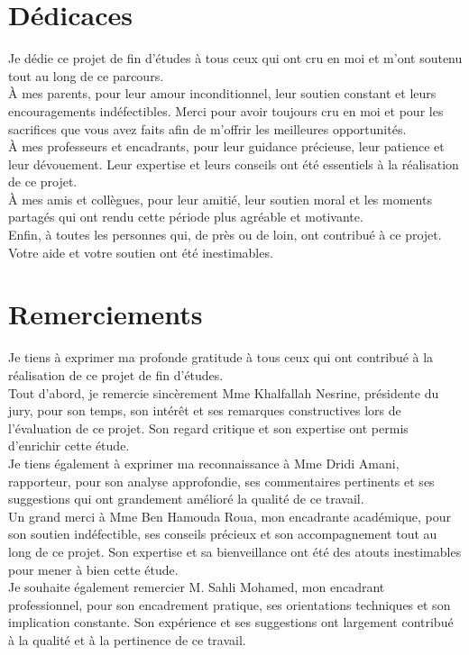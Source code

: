 \documentclass[12pt,a4paper]{report}
\begin{document}
\cleardoublepage
\thispagestyle{empty}
\chapter*{Dédicaces}
{}
Je dédie ce projet de fin d’études à tous ceux qui ont cru en moi et m’ont soutenu tout au long de ce parcours.\\
À mes parents, pour leur amour inconditionnel, leur soutien constant et leurs encouragements indéfectibles. Merci pour avoir toujours cru en moi et pour les sacrifices que vous avez faits afin de m’offrir les meilleures opportunités.\\
À mes professeurs et encadrants, pour leur guidance précieuse, leur patience et leur dévouement. Leur expertise et leurs conseils ont été essentiels à la réalisation de ce projet.\\
À mes amis et collègues, pour leur amitié, leur soutien moral et les moments partagés qui ont rendu cette période plus agréable et motivante.\\
Enfin, à toutes les personnes qui, de près ou de loin, ont contribué à ce projet. Votre aide et votre soutien ont été inestimables.

\cleardoublepage
{}
\chapter*{Remerciements}
Je tiens à exprimer ma profonde gratitude à tous ceux qui ont contribué à la réalisation de ce projet de fin d’études.\\
Tout d’abord, je remercie sincèrement Mme Khalfallah Nesrine, présidente du jury, pour son temps, son intérêt et ses remarques constructives lors de l’évaluation de ce projet. Son regard critique et son expertise ont permis d’enrichir cette étude.\\
Je tiens également à exprimer ma reconnaissance à Mme Dridi Amani, rapporteur, pour son analyse approfondie, ses commentaires pertinents et ses suggestions qui ont grandement amélioré la qualité de ce travail.\\
Un grand merci à Mme Ben Hamouda Roua, mon encadrante académique, pour son soutien indéfectible, ses conseils précieux et son accompagnement tout au long de ce projet. Son expertise et sa bienveillance ont été des atouts inestimables pour mener à bien cette étude.\\
Je souhaite également remercier M. Sahli Mohamed, mon encadrant professionnel, pour son encadrement pratique, ses orientations techniques et son implication constante. Son expérience et ses suggestions ont largement contribué à la qualité et à la pertinence de ce travail.
\end{document}
